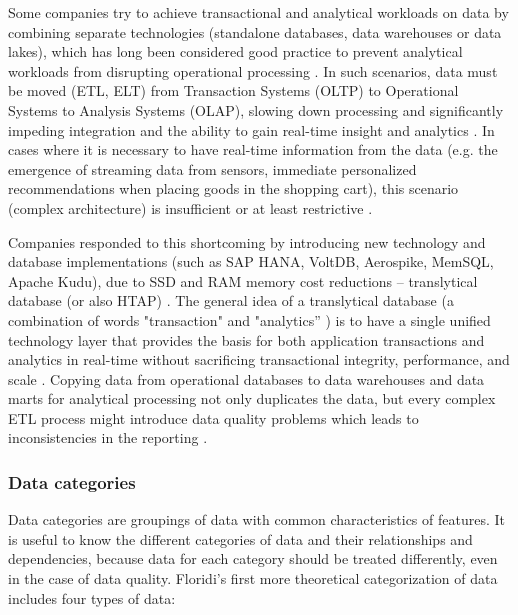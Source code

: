 				Some companies try to achieve transactional and analytical workloads on data by combining separate technologies (standalone databases, data warehouses or data lakes), which has long been considered good practice to prevent analytical workloads from disrupting operational processing \cite{SAP2018}. In such scenarios, data must be moved (ETL, ELT) from Transaction Systems (OLTP) to Operational Systems to Analysis Systems (OLAP), slowing down processing and significantly impeding integration and the ability to gain real-time insight and analytics \cite{SAP2018}. In cases where it is necessary to have real-time information from the data (e.g. the emergence of streaming data from sensors, immediate personalized recommendations when placing goods in the shopping cart), this scenario (complex architecture) is insufficient or at least restrictive \cite{SAP2018}.
				
				Companies responded to this shortcoming by introducing new technology and database implementations (such as SAP HANA, VoltDB, Aerospike, MemSQL, Apache Kudu), due to SSD and RAM memory cost reductions \cite{Kerremans2018} -- translytical database (or also HTAP) \cite{Kerremans2018}\cite{SAP2018}. The general idea of a translytical database (a combination of words "transaction" and "analytics” \cite{SAP2018}) is to have a single unified technology layer that provides the basis for both application transactions and analytics in real-time without sacrificing transactional integrity, performance, and scale \cite{Kerner2019}. Copying data from operational databases to data warehouses and data marts for analytical processing not only duplicates the data, but every complex ETL process might introduce data quality problems which leads to inconsistencies in the reporting \cite{Kerremans2018}.
				
					    		    				  	
			\subsubsection{Data categories}
			\label{subsec:data_categories}
											
				Data categories are groupings of data with common characteristics of features. It is useful to know the different categories of data and their relationships and dependencies, because data for each category should be treated differently, even in the case of data quality. Floridi's \cite{Floridi1999} first more theoretical categorization of data includes four types of data:


